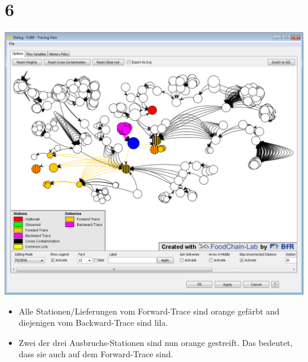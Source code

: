 \documentclass{beamer}
\begin{document}
\section{6}
\begin{frame}
	\begin{center}
  		\includegraphics[height=0.6\textheight]{6.png}
	\end{center}
	\begin{itemize}
		\item Alle Stationen/Lieferungen vom Forward-Trace sind orange gefärbt and diejenigen vom Backward-Trace sind lila.
		\item Zwei der drei Ausbruchs-Stationen sind nun orange gestreift. Das bedeutet, dass sie auch auf dem Forward-Trace sind.
	\end{itemize}
\end{frame}
\end{document}
